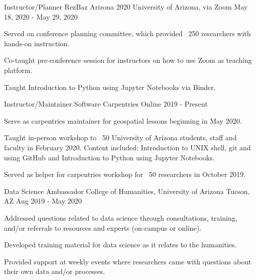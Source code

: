 


\begin{cventries}

\cventry
{Instructor/Planner} %
{RezBaz Arizona 2020} %
{University of Arizona, via Zoom} %
{May 18, 2020 - May 29, 2020} %
{ %
\begin{cvitems}
\item {Served on conference planning committee, which provided ~250 researchers with hands-on instruction.}
\item {Co-taught pre-conference session for instructors on how to use Zoom as teaching platform.}
\item {Taught Introduction to Python using Jupyter Notebooks via Binder.}
\end{cvitems}
}

\cventry
{Instructor/Maintainer} %
{Software Carpentries} %
{Online} %
{2019 - Present} %
{ %
\begin{cvitems}
\item {Serve as carpentries maintainer for geospatial lessons beginning in May 2020.}
\item {Taught in-person workshop to ~50 University of Arizona students, staff and faculty in February 2020. Content included: Introduction to UNIX shell, git and using GitHub and Introduction to Python using Jupyter Notebooks.}
\item {Served as helper for carpentries workshop for ~50 researchers in October 2019.}
\end{cvitems}
}


\cventry
{Data Science Ambassador} %
{College of Humanities, University of Arizona} %
{Tucson, AZ} %
{Aug 2019 - May 2020} %
{ %
\begin{cvitems}
\item {Addressed questions related to data science through consultations, training, and/or referrals to resources and experts (on-campus or online).}
\item {Developed training material for data science as it relates to the humanities.}
\item {Provided support at weekly events where researchers came with questions about their own data and/or processes.}
\end{cvitems}
}


\end{cventries}

